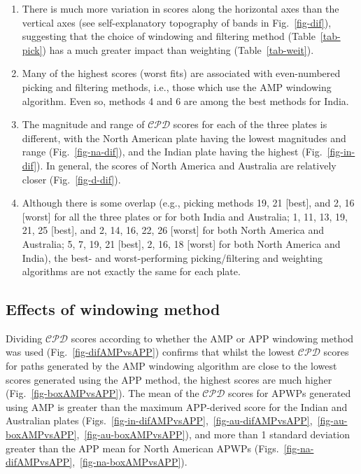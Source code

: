 \begin{enumerate}
  \item There is much more variation in scores along the horizontal axes than
	the vertical axes (see self-explanatory topography of bands in
	Fig.~\ref{fig-dif}), suggesting that the choice of windowing and filtering
	method (Table~\ref{tab-pick}) has a much greater impact than weighting
	(Table~\ref{tab-weit}).
  \item Many of the highest scores (worst fits) are associated with
	even-numbered picking and filtering methods, i.e., those which use the AMP
	windowing algorithm. Even so, methods 4 and 6 are among the best methods for
	India.
  \item The magnitude and range of $\mathcal{CPD}$ scores for each of the three
	plates is different, with the North American plate having the lowest
	magnitudes and range (Fig.~\ref{fig-na-dif}), and the Indian plate having
	the highest (Fig.~\ref{fig-in-dif}). In general, the scores of North America
	and Australia are relatively closer (Fig.~\ref{fig-d-dif}).
  \item Although there is some overlap (e.g., picking methods 19, 21 [best], and
	2, 16 [worst] for all the three plates or for both India and Australia; 1,
	11, 13, 19, 21, 25 [best], and 2, 14, 16, 22, 26 [worst] for both North
	America and Australia; 5, 7, 19, 21 [best], 2, 16, 18 [worst] for both North
	America and India), the best- and worst-performing picking/filtering and
	weighting algorithms are not exactly the same for each plate.
\end{enumerate}

\subsection{Effects of windowing method}

Dividing $\mathcal{CPD}$ scores according to whether the AMP or APP windowing
method was used (Fig.~\ref{fig-difAMPvsAPP}) confirms that whilst the lowest
$\mathcal{CPD}$ scores for paths generated by the AMP windowing algorithm are
close to the lowest scores generated using the APP method, the highest scores
are much higher (Fig.~\ref{fig-boxAMPvsAPP}). The mean of the $\mathcal{CPD}$
scores for APWPs generated using AMP is greater than the maximum APP-derived
score for the Indian and Australian plates
(Figs.~\ref{fig-in-difAMPvsAPP},~\ref{fig-au-difAMPvsAPP},~\ref{fig-au-boxAMPvsAPP},~\ref{fig-au-boxAMPvsAPP}),
and more than 1 standard deviation greater than the APP mean for North American
APWPs (Figs.~\ref{fig-na-difAMPvsAPP},~\ref{fig-na-boxAMPvsAPP}).

